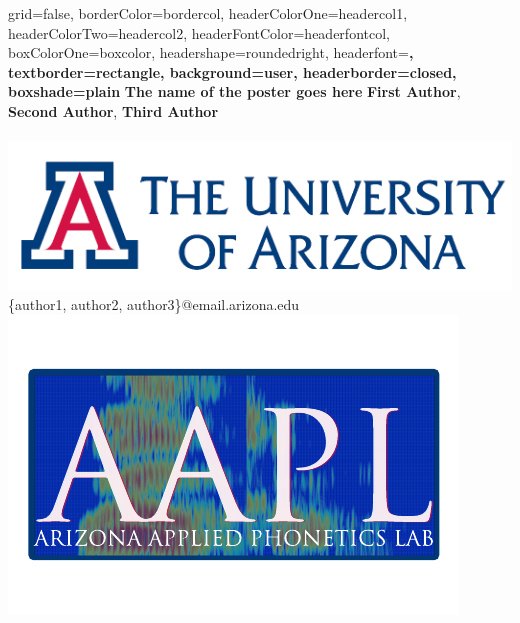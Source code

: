 \documentclass[a0paper,portrait,columns=2]{baposter}
\begin{document}
\begin{poster}{
grid=false,
borderColor=bordercol, %
headerColorOne=headercol1, %
headerColorTwo=headercol2, %
headerFontColor=headerfontcol, %
boxColorOne=boxcolor, %
headershape=roundedright, %
headerfont=\Large\sf\bf, %
textborder=rectangle,
background=user,
headerborder=closed, %
boxshade=plain
}
{}
%
%
{\sf\bf \LARGE{The name of the poster goes here}}
{\vspace{.6em} \textbf{First Author}, \textbf{Second Author}, \textbf{Third Author}\\ 
 \\
{\hspace{-7in}\includegraphics[scale=0.2]{UA_logo}\phantom{.}} \\
{\vspace{-.4in}\smaller \{author1, author2, author3\}@email.arizona.edu} \\
{\vspace{-.45in}\phantom{.}\hspace{7in}\includegraphics[scale=0.35]{aalp_logo}}\vspace{-.6in}}





\end{poster}
\end{document}
